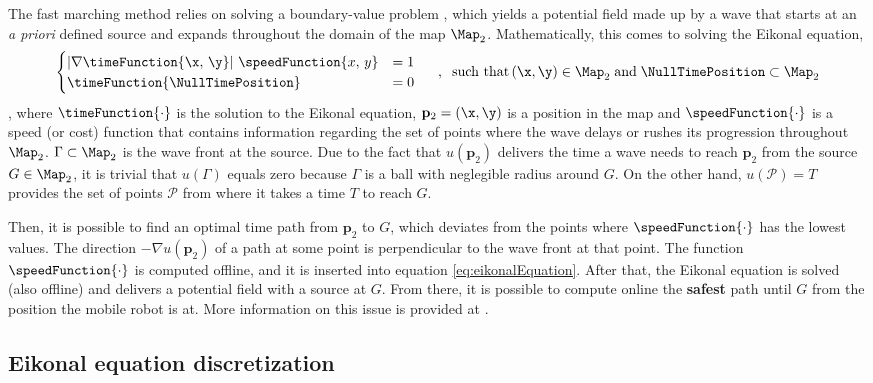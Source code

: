The fast marching method relies on solving a boundary-value problem \cite{Sethian1999}, which yields a potential field made up by a wave that starts at an \textit{a priori} defined source and expands throughout the domain of the map $\Map_2$. Mathematically, this comes to solving the Eikonal equation,
\begin{equation}
	\begin{cases}
		\left\vert \nabla \timeFunction{\x,\,\y} \right\vert \, \speedFunction{x,\, y} &= 1 \\
		\timeFunction{\NullTimePosition} &= 0
 	\end{cases}\hspace{5mm} , \hspace{2mm} \text{such that}\,(\x, \y) \in \Map_2\; \text{and} \; \NullTimePosition \subset \Map_2
	\label{eq:eikonalEquation}
\end{equation}
, where $\timeFunction{\cdot}$ is the solution to the Eikonal equation, $\mathbf{p}_2 = (\x, \y)$ is a position in the map and $\speedFunction{\cdot}$ is a speed (or cost) function \cite{Ventura2015} that contains information regarding the set of points where the wave delays or  rushes its progression throughout $\Map_{2}$. $\Gamma \subset \Map_{2}$ is the wave front at the source. Due to the fact that $u(\mathbf{p}_2)$ delivers the time a wave needs to reach $\mathbf{p}_2$ from the source $G \in \Map_{2}$, it is trivial that $u(\Gamma)$ equals zero because $\Gamma$ is a ball with neglegible radius around $G$. On the other hand, $u(\mathcal{P}) = T$ provides the set of points $\mathcal{P}$ from where it takes a time $T$ to reach $G$.

Then, it is possible to find an optimal time path from $\mathbf{p}_2$ to $G$, which deviates from the points where $\speedFunction{\cdot}$ has the lowest values. The direction $-\nabla u(\mathbf{p}_2)$ of a path at some point is perpendicular to the wave front at that point. The function $\speedFunction{\cdot}$ is computed offline, and it is inserted into equation \eqref{eq:eikonalEquation}. After that, the Eikonal equation is solved (also offline) and delivers a potential field with a source at $G$. From there, it is possible to compute online the \textbf{safest} path until $G$ from the position the mobile robot is at. More information on this issue is provided at \cite{fmAdvancedGomez}.

\subsection*{Eikonal equation discretization}
\label{subsection:eikonalEqDiscretization}

